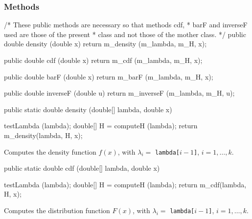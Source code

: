 \subsubsection* {Methods}

\begin{code}\begin{hide}
  /*  These public methods are necessary so that methods cdf,
   *  barF and inverseF used are those of the present
   *  class and not those of the mother class.
   */
   public double density (double x) {
     return m_density (m_lambda, m_H, x);
   }

   public double cdf (double x) {
      return m_cdf (m_lambda, m_H, x);
   }

   public double barF (double x) {
      return m_barF (m_lambda, m_H, x);
   }

   public double inverseF (double u) {
      return m_inverseF (m_lambda, m_H, u);
   }\end{hide}

   public static double density (double[] lambda, double x)\begin{hide} {
      testLambda (lambda);
      double[] H = computeH (lambda);
      return m_density(lambda, H, x);
   }\end{hide}
\end{code}
  \begin{tabb} Computes the density function $f(x)$, with $\lambda_i = $
\texttt{lambda[$i-1$]}, $i = 1,\ldots,k$.
\end{tabb}
\begin{htmlonly}
\end{htmlonly}
\begin{code}

   public static double cdf (double[] lambda, double x)\begin{hide} {
      testLambda (lambda);
      double[] H = computeH (lambda);
      return m_cdf(lambda, H, x);
   }\end{hide}
\end{code}
\begin{tabb}  Computes the distribution function $F(x)$,
with $\lambda_i = $ \texttt{lambda[$i-1$]}, $i = 1,\ldots,k$.
 \end{tabb}
\begin{htmlonly}
\end{htmlonly}
